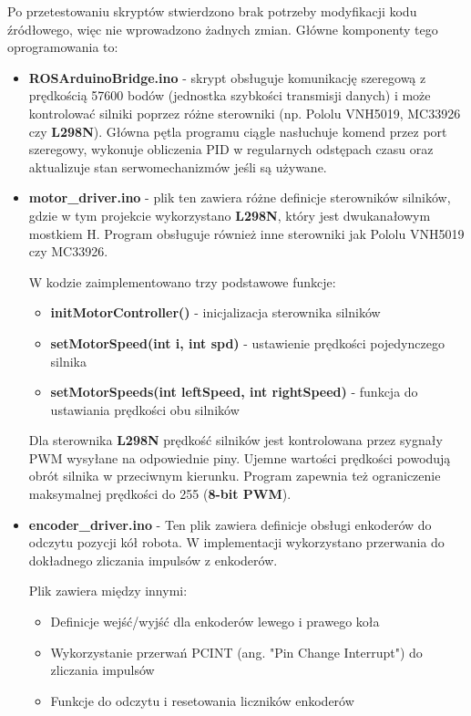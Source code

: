 \documentclass[a4paper,twoside,12pt]{book}
\begin{document}
Po przetestowaniu skryptów stwierdzono brak potrzeby modyfikacji kodu źródłowego, więc nie wprowadzono żadnych zmian. Główne komponenty tego oprogramowania to:
\begin{itemize}
	\item \textbf{ROSArduinoBridge.ino} -  skrypt obsługuje komunikację szeregową z prędkością 57600 bodów (jednostka szybkości transmisji danych) i może kontrolować silniki poprzez różne sterowniki (np. Pololu VNH5019, MC33926 czy \textbf{L298N}). 
	Główna pętla programu ciągle nasłuchuje komend przez port szeregowy, wykonuje obliczenia PID w regularnych odstępach czasu oraz aktualizuje stan serwomechanizmów jeśli są używane. 
	
	\item \textbf{motor\_driver.ino} - plik ten zawiera różne definicje sterowników silników, gdzie w tym projekcie wykorzystano  \textbf{L298N}, który jest dwukanałowym mostkiem H. Program obsługuje również inne sterowniki jak Pololu VNH5019 czy MC33926.

	W kodzie zaimplementowano trzy podstawowe funkcje:
	\begin{itemize}
	\item \textbf{initMotorController()} - inicjalizacja sterownika silników
	\item \textbf{setMotorSpeed(int i, int spd)} - ustawienie prędkości pojedynczego silnika 
	\item \textbf{setMotorSpeeds(int leftSpeed, int rightSpeed)} - funkcja do ustawiania prędkości obu silników
	\end{itemize}

	Dla sterownika \textbf{L298N} prędkość silników jest kontrolowana przez sygnały PWM wysyłane na odpowiednie piny. Ujemne wartości prędkości powodują obrót silnika w przeciwnym kierunku. Program zapewnia też ograniczenie maksymalnej prędkości do 255 (\textbf{8-bit PWM}).
	\newpage
	\item \textbf{encoder\_driver.ino} - Ten plik zawiera definicje obsługi enkoderów do odczytu pozycji kół robota. W implementacji wykorzystano przerwania do dokładnego zliczania impulsów z enkoderów.

	Plik zawiera między innymi:
	\begin{itemize}
	\item Definicje wejść/wyjść dla enkoderów lewego i prawego koła
	\item Wykorzystanie przerwań PCINT (ang. "Pin Change Interrupt") do zliczania impulsów
	\item Funkcje do odczytu i resetowania liczników enkoderów
	\end{itemize}


\end{itemize}
\end{document}

